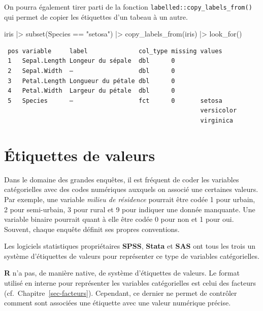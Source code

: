 \documentclass[
  letterpaper,
  DIV=11,
  numbers=noendperiod,
  oneside]{scrreprt}
\newenvironment{Shaded}{\begin{snugshade}}{\end{snugshade}}
\newcommand{\FunctionTok}[1]{\textcolor[rgb]{0.28,0.35,0.67}{#1}}
\newcommand{\NormalTok}[1]{\textcolor[rgb]{0.00,0.23,0.31}{#1}}
\newcommand{\SpecialCharTok}[1]{\textcolor[rgb]{0.37,0.37,0.37}{#1}}
\newcommand{\StringTok}[1]{\textcolor[rgb]{0.13,0.47,0.30}{#1}}
\begin{document}
On pourra également tirer parti de la fonction
\texttt{labelled::copy\_labels\_from()} qui permet de copier les
étiquettes d'un tabeau à un autre.

\begin{Shaded}
\begin{Highlighting}[]
\NormalTok{iris }\SpecialCharTok{|\textgreater{}} 
  \FunctionTok{subset}\NormalTok{(Species }\SpecialCharTok{==} \StringTok{"setosa"}\NormalTok{) }\SpecialCharTok{|\textgreater{}} 
  \FunctionTok{copy\_labels\_from}\NormalTok{(iris) }\SpecialCharTok{|\textgreater{}} 
  \FunctionTok{look\_for}\NormalTok{()}
\end{Highlighting}
\end{Shaded}

\begin{verbatim}
 pos variable     label              col_type missing values    
 1   Sepal.Length Longeur du sépale  dbl      0                 
 2   Sepal.Width  —                  dbl      0                 
 3   Petal.Length Longueur du pétale dbl      0                 
 4   Petal.Width  Largeur du pétale  dbl      0                 
 5   Species      —                  fct      0       setosa    
                                                      versicolor
                                                      virginica 
\end{verbatim}

\hypertarget{sec-etiquettes-valeurs}{%
\chapter{Étiquettes de valeurs}\label{sec-etiquettes-valeurs}}

Dans le domaine des grandes enquêtes, il est fréquent de coder les
variables catégorielles avec des codes numériques auxquels on associé
une certaines valeurs. Par exemple, une variable \emph{milieu de
résidence} pourrait être codée 1 pour urbain, 2 pour semi-urbain, 3 pour
rural et 9 pour indiquer une donnée manquante. Une variable binaire
pourrait quant à elle être codée 0 pour non et 1 pour oui. Souvent,
chaque enquête définit ses propres conventions.

Les logiciels statistiques propriétaires \textbf{SPSS}, \textbf{Stata}
et \textbf{SAS} ont tous les trois un système d'étiquettes de valeurs
pour représenter ce type de variables catégorielles.

\textbf{R} n'a pas, de manière native, de système d'étiquettes de
valeurs. Le format utilisé en interne pour représenter les variables
catégorielles est celui des facteurs (cf.~Chapitre~\ref{sec-facteurs}).
Cependant, ce dernier ne permet de contrôler comment sont associées une
étiquette avec une valeur numérique précise.
\end{document}
